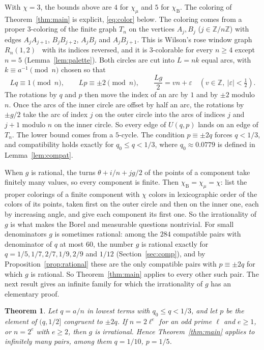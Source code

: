 \documentclass[11pt]{amsart}
\newtheorem{theorem}{Theorem}[section]
\theoremstyle{remark}
\numberwithin{equation}{section}
\newcommand{\Z}{\mathbb{Z}}
\newcommand{\chiB}{\chi_{\mathrm B}}
\newcommand{\chiM}{\chi_{\mu}}
\begin{document}
With $\chi=3$, the bounds above are $4$ for $\chiM$ and $5$ for $\chiB$.
The coloring of Theorem~\ref{thm:main} is explicit, \eqref{eq:color}
below. The coloring comes from a proper
$3$-coloring of the finite graph $T_n$ on the vertices $A_j,B_j$
($j\in\Z/n\Z$) with edges $A_jA_{j+1}$, $B_jB_{j+2}$, $A_jB_j$ and
$A_jB_{j+1}$. This is Wilson's rose window graph $R_n(1,2)$~\cite{Wil08}
with its indices reversed, and it is $3$-colorable for every $n\ge4$
except $n=5$ (Lemma~\ref{lem:palette}). Both circles are cut into
$L=nk$ equal arcs, with $k\equiv a^{-1}\pmod n$ chosen so that
\[
Lq\equiv1\pmod n,\qquad Lp\equiv\pm2\pmod n,\qquad
\frac{Lg}{2}=vn+\varepsilon\quad(v\in\Z,\ |\varepsilon|<\tfrac12).
\]
The rotations by $q$ and $p$ then move the index of an arc by $1$ and by
$\pm2$ modulo $n$. Once the arcs of the inner circle are offset by half
an arc, the rotations by $\pm g/2$ take the arc of index $j$ on the outer
circle into the arcs of indices $j$ and $j+1$ modulo $n$ on the inner
circle. So every edge of $U(q,p)$ lands on an edge of $T_n$. The lower
bound comes from a $5$-cycle. The condition $p\equiv\pm2q$ forces
$q<1/3$, and compatibility holds exactly for $q_0\le q<1/3$, where
$q_0\approx0.0779$ is defined in Lemma~\ref{lem:compat}.

When $g$ is rational, the turns $\theta+i/n+jg/2$ of the points of a
component take finitely many values, so every component is finite. Then
$\chiB=\chiM=\chi$: list the proper colorings of a finite component
with $\chi$ colors in lexicographic order of the colors of its points,
taken first on the outer circle and then on the inner one, each by
increasing angle, and give each component its first one. So the irrationality of $g$
is what makes the Borel and measurable questions nontrivial. For small
denominators $g$ is sometimes rational: among the $284$ compatible pairs with
denominator of $q$ at most $60$, the number $g$ is rational exactly for
$q=1/5,1/7,2/7,1/9,2/9$ and $1/12$ (Section~\ref{sec:comp}), and by
Proposition~\ref{prop:rational} these are the only compatible pairs with
$p\equiv\pm2q$ for which $g$ is rational. So Theorem~\ref{thm:main}
applies to every other such pair. The next result gives an infinite
family for which the irrationality of $g$ has an elementary proof.

\begin{theorem}\label{thm:family}
Let $q=a/n$ in lowest terms with $q_0\le q<1/3$, and let $p$ be the
element of $(q,1/2]$ congruent to $\pm2q$. If $n=2\ell^e$ for an odd
prime $\ell$ and $e\ge1$, or $n=2^e$ with $e\ge2$, then $g$ is
irrational. Hence Theorem~\ref{thm:main} applies to infinitely many
pairs, among them $q=1/10$, $p=1/5$.
\end{theorem}
\end{document}
